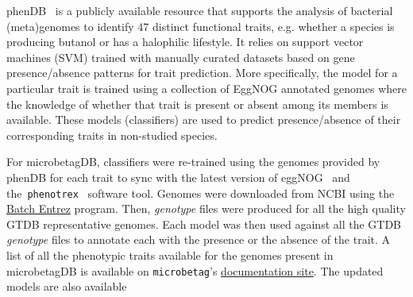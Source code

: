 \documentclass[sn-mathphys,Numbered]{sn-jnl}  %
\theoremstyle{thmstyleone}%
\theoremstyle{thmstyletwo}%
\theoremstyle{thmstylethree}%
\newcommand{\microbetag}{\texttt{microbetag}}
\begin{document}
        phenDB~\cite{feldbauer2015prediction} is a publicly available resource that supports the analysis of bacterial (meta)genomes to identify 47 distinct functional traits, e.g. whether a species is producing butanol or has a halophilic lifestyle.
        It relies on support vector machines (SVM) trained with manually curated datasets based on gene presence/absence patterns for trait prediction.
        More specifically, the model for a particular trait is trained using a collection of EggNOG annotated genomes where the knowledge of whether that trait is present or absent among its members is available.
        These models (classifiers) are used to predict presence/absence of their corresponding traits in non-studied species. 

        For microbetagDB, %
        classifiers were re-trained using the genomes provided by phenDB for each trait to sync with the latest version of eggNOG~\cite{huerta2019eggnog} and the~\texttt{phenotrex}~\cite{feldbauer2015prediction} software tool.
        Genomes were downloaded from NCBI using the \href{https://www.ncbi.nlm.nih.gov/sites/batchentrez}{Batch Entrez} program.
        Then, \textit{genotype} files were produced for all the high quality GTDB representative genomes.
        Each model was then used against all the GTDB \textit{genotype} files to annotate each with the presence or the absence of the trait. 
        A list of all the phenotypic traits available for the genomes present in microbetagDB is available on \microbetag 's \href{https://hariszaf.github.io/microbetag/docs/modules/phen-traits/}{documentation site}.
        The updated models are also available
\end{document}
